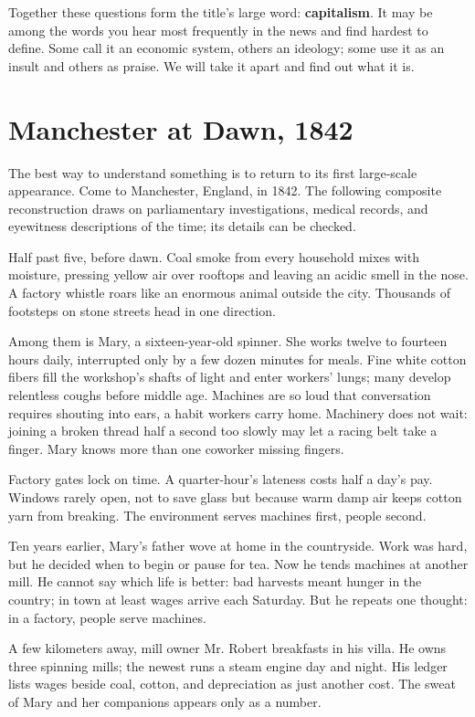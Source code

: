 Together these questions form the title's large word: \textbf{capitalism}. It may be among the words you hear most frequently in the news and find hardest to define. Some call it an economic system, others an ideology; some use it as an insult and others as praise. We will take it apart and find out what it is.

\section{Manchester at Dawn, 1842}
The best way to understand something is to return to its first large-scale appearance. Come to Manchester, England, in 1842. The following composite reconstruction draws on parliamentary investigations, medical records, and eyewitness descriptions of the time; its details can be checked.

Half past five, before dawn. Coal smoke from every household mixes with moisture, pressing yellow air over rooftops and leaving an acidic smell in the nose. A factory whistle roars like an enormous animal outside the city. Thousands of footsteps on stone streets head in one direction.

Among them is Mary, a sixteen-year-old spinner. She works twelve to fourteen hours daily, interrupted only by a few dozen minutes for meals. Fine white cotton fibers fill the workshop's shafts of light and enter workers' lungs; many develop relentless coughs before middle age. Machines are so loud that conversation requires shouting into ears, a habit workers carry home. Machinery does not wait: joining a broken thread half a second too slowly may let a racing belt take a finger. Mary knows more than one coworker missing fingers.

Factory gates lock on time. A quarter-hour's lateness costs half a day's pay. Windows rarely open, not to save glass but because warm damp air keeps cotton yarn from breaking. The environment serves machines first, people second.

Ten years earlier, Mary's father wove at home in the countryside. Work was hard, but he decided when to begin or pause for tea. Now he tends machines at another mill. He cannot say which life is better: bad harvests meant hunger in the country; in town at least wages arrive each Saturday. But he repeats one thought: in a factory, people serve machines.

A few kilometers away, mill owner Mr. Robert breakfasts in his villa. He owns three spinning mills; the newest runs a steam engine day and night. His ledger lists wages beside coal, cotton, and depreciation as just another cost. The sweat of Mary and her companions appears only as a number.

